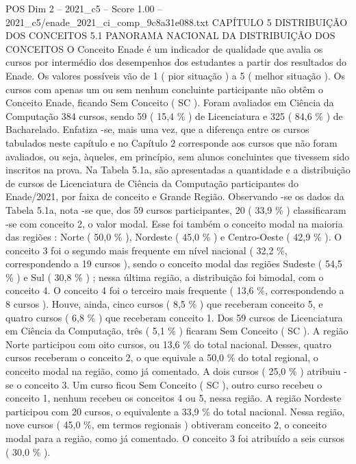\begin{textsample}{POS Dim 2 – 2021\_c5 – Score 1.00 – 2021\_c5/enade\_2021\_ci\_comp\_9c8a31e088.txt}  \label{ex:f2_pos_285}
CAPÍTULO 5 DISTRIBUIÇÃO DOS CONCEITOS 5.1 PANORAMA NACIONAL DA DISTRIBUIÇÃO DOS CONCEITOS O Conceito Enade é um indicador de qualidade que avalia os cursos por intermédio dos desempenhos dos estudantes a partir dos resultados do Enade.
Os valores possíveis vão de 1 ( pior situação ) a 5 ( melhor situação ).
Os cursos com apenas um ou sem nenhum concluinte participante não obtêm o Conceito Enade, ficando Sem Conceito ( SC ).
Foram avaliados em Ciência da Computação 384 cursos, sendo 59 ( 15,4 \% ) de Licenciatura e 325 ( 84,6 \% ) de Bacharelado.
Enfatiza -se, mais uma vez, que a diferença entre os cursos tabulados neste capítulo e no Capítulo 2 corresponde aos cursos que não foram avaliados, ou seja, àqueles, em princípio, sem alunos concluintes que tivessem sido inscritos na prova.
Na Tabela 5.1a, são apresentadas a quantidade e a distribuição de cursos de Licenciatura de Ciência da Computação participantes do Enade/2021, por faixa de conceito e Grande Região.
Observando -se os dados da Tabela 5.1a, nota -se que, dos 59 cursos participantes, 20 ( 33,9 \% ) classificaram -se com conceito 2, o valor modal.
Esse foi também o conceito modal na maioria das regiões : Norte ( 50,0 \% ), Nordeste ( 45,0 \% ) e Centro-Oeste ( 42,9 \% ).
O conceito 3 foi o segundo mais frequente em nível nacional ( 32,2 \%, correspondendo a 19 cursos ), sendo o conceito modal das regiões Sudeste ( 54,5 \% ) e Sul ( 30,8 \% ) ; nessa última região, a distribuição foi bimodal, com o conceito 4.
O conceito 4 foi o terceiro mais frequente ( 13,6 \%, correspondendo a 8 cursos ).
Houve, ainda, cinco cursos ( 8,5 \% ) que receberam conceito 5, e quatro cursos ( 6,8 \% ) que receberam conceito 1.
Dos 59 cursos de Licenciatura em Ciência da Computação, três ( 5,1 \% ) ficaram Sem Conceito ( SC ).
A região Norte participou com oito cursos, ou 13,6 \% do total nacional.
Desses, quatro cursos receberam o conceito 2, o que equivale a 50,0 \% do total regional, o conceito modal na região, como já comentado.
A dois cursos ( 25,0 \% ) atribuiu -se o conceito 3.
Um curso ficou Sem Conceito ( SC ), outro curso recebeu o conceito 1, nenhum recebeu os conceitos 4 ou 5, nessa região.
A região Nordeste participou com 20 cursos, o equivalente a 33,9 \% do total nacional.
Nessa região, nove cursos ( 45,0 \%, em termos regionais ) obtiveram conceito 2, o conceito modal para a região, como já comentado.
O conceito 3 foi atribuído a seis cursos ( 30,0 \% ).

\end{textsample}
